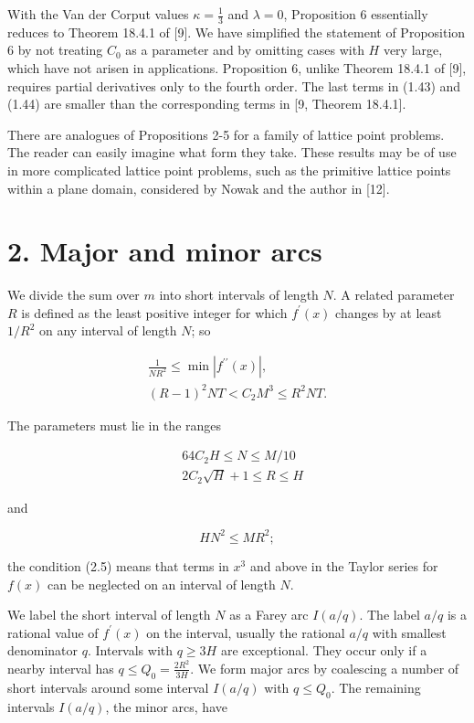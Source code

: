\documentclass[10pt]{article}
\begin{document}
With the Van der Corput values $\kappa=\frac{1}{3}$ and $\lambda=0$, Proposition 6 essentially reduces to Theorem 18.4.1 of [9]. We have simplified the statement of Proposition 6 by not treating $C_{0}$ as a parameter and by omitting cases with $H$ very large, which have not arisen in applications. Proposition 6, unlike Theorem 18.4.1 of [9], requires partial derivatives only to the fourth order. The last terms in (1.43) and (1.44) are smaller than the corresponding terms in [9, Theorem 18.4.1].

There are analogues of Propositions 2-5 for a family of lattice point problems. The reader can easily imagine what form they take. These results may be of use in more complicated lattice point problems, such as the primitive lattice points within a plane domain, considered by Nowak and the author in [12].

\section*{2. Major and minor arcs}
We divide the sum over $m$ into short intervals of length $N$. A related parameter $R$ is defined as the least positive integer for which $f^{\prime}(x)$ changes by at least $1 / R^{2}$ on any interval of length $N$; so


\begin{gather*}
\frac{1}{N R^{2}} \leqslant \min \left|f^{\prime \prime}(x)\right|,  \tag{2.1}\\
(R-1)^{2} N T<C_{2} M^{3} \leqslant R^{2} N T. \tag{2.2}
\end{gather*}


The parameters must lie in the ranges


\begin{align*}
& 64 C_{2} H \leqslant N \leqslant M / 10  \tag{2.3}\\
& 2 C_{2} \sqrt{H}+1 \leqslant R \leqslant H \tag{2.4}
\end{align*}


and


\begin{equation*}
H N^{2} \leqslant M R^{2}; \tag{2.5}
\end{equation*}


the condition (2.5) means that terms in $x^{3}$ and above in the Taylor series for $f(x)$ can be neglected on an interval of length $N$.

We label the short interval of length $N$ as a Farey arc $I(a / q)$. The label $a / q$ is a rational value of $f^{\prime}(x)$ on the interval, usually the rational $a / q$ with smallest denominator $q$. Intervals with $q \geqslant 3 H$ are exceptional. They occur only if a nearby interval has $q \leqslant Q_{0}=\frac{2R^{2}}{3H}$. We form major arcs by coalescing a number of short intervals around some interval $I(a / q)$ with $q \leqslant Q_{0}$. The remaining intervals $I(a / q)$, the minor arcs, have
\end{document}
